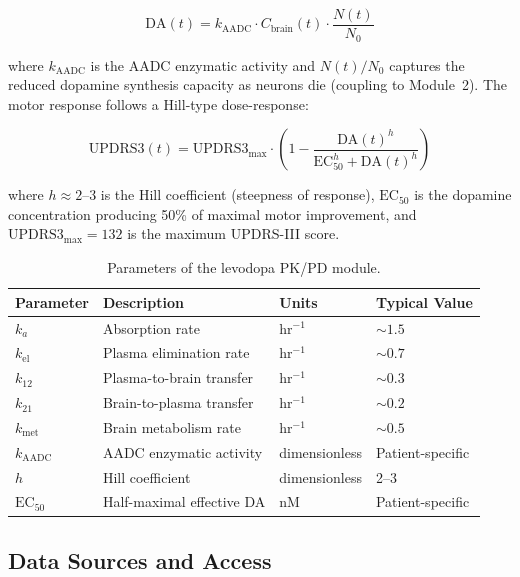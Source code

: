 \begin{equation}
\text{DA}(t) = k_\text{AADC} \cdot C_\text{brain}(t) \cdot \frac{N(t)}{N_0}
\label{eq:dopamine}
\end{equation}

where $k_\text{AADC}$ is the AADC enzymatic activity and $N(t)/N_0$ captures the reduced dopamine synthesis capacity as neurons die (coupling to Module~2). The motor response follows a Hill-type dose-response:

\begin{equation}
\text{UPDRS3}(t) = \text{UPDRS3}_\text{max} \cdot \left(1 - \frac{\text{DA}(t)^h}{\text{EC}_{50}^h + \text{DA}(t)^h}\right)
\label{eq:hill-response}
\end{equation}

where $h \approx 2$--3 is the Hill coefficient (steepness of response), $\text{EC}_{50}$ is the dopamine concentration producing 50\% of maximal motor improvement, and $\text{UPDRS3}_\text{max} = 132$ is the maximum UPDRS-III score.

\begin{table}[h]
\centering
\caption{Parameters of the levodopa PK/PD module.}
\label{tab:pkpd-params}
\small
\begin{tabular}{llll}
\toprule
\textbf{Parameter} & \textbf{Description} & \textbf{Units} & \textbf{Typical Value} \\
\midrule
$k_a$ & Absorption rate & hr$^{-1}$ & $\sim 1.5$ \\
$k_\text{el}$ & Plasma elimination rate & hr$^{-1}$ & $\sim 0.7$ \\
$k_{12}$ & Plasma-to-brain transfer & hr$^{-1}$ & $\sim 0.3$ \\
$k_{21}$ & Brain-to-plasma transfer & hr$^{-1}$ & $\sim 0.2$ \\
$k_\text{met}$ & Brain metabolism rate & hr$^{-1}$ & $\sim 0.5$ \\
$k_\text{AADC}$ & AADC enzymatic activity & dimensionless & Patient-specific \\
$h$ & Hill coefficient & dimensionless & 2--3 \\
$\text{EC}_{50}$ & Half-maximal effective DA & nM & Patient-specific \\
\bottomrule
\end{tabular}
\end{table}

\subsection{Data Sources and Access}

